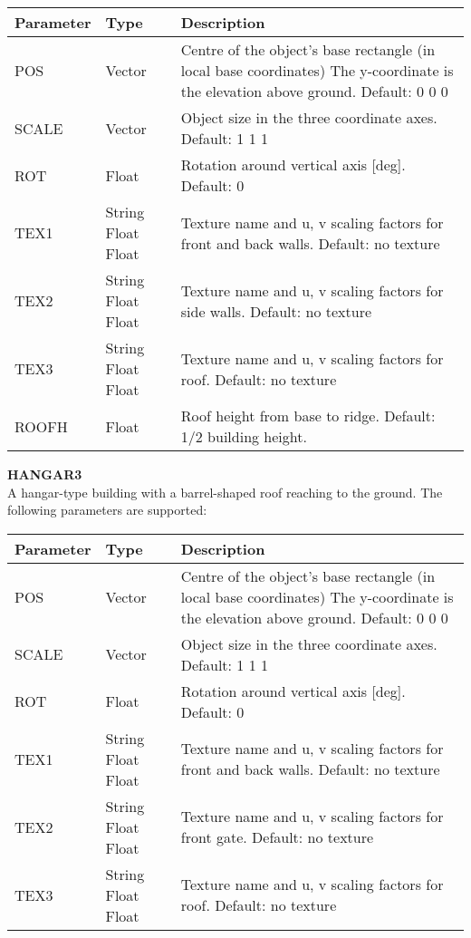 \documentclass[Orbiter Developer Manual.tex]{subfiles}
\begin{document}
	\begin{longtable}{ |p{}|p{}|p{}| }
	\hline\rule{0pt}{2ex}
	\textbf{Parameter} & \textbf{Type} & \textbf{Description}\\
	\hline\rule{0pt}{2ex}
	POS & Vector & Centre of the object’s base rectangle (in local base coordinates) The y-coordinate is the elevation above ground. Default: 0 0 0\\
	\hline\rule{0pt}{2ex}
	SCALE & Vector & Object size in the three coordinate axes. Default: 1 1 1\\
	\hline\rule{0pt}{2ex}
	ROT & Float & Rotation around vertical axis [deg]. Default: 0\\
	\hline\rule{0pt}{2ex}
	TEX1 & String Float Float & Texture name and u, v scaling factors for front and back walls. Default: no texture\\
	\hline\rule{0pt}{2ex}
	TEX2 & String Float Float & Texture name and u, v scaling factors for side walls. Default: no texture\\
	\hline\rule{0pt}{2ex}
	TEX3 & String Float Float & Texture name and u, v scaling factors for roof. Default: no texture\\
	\hline\rule{0pt}{2ex}
	ROOFH & Float & Roof height from base to ridge. Default: 1/2 building height.\\
	\hline
	\end{longtable}

\noindent
\textbf{HANGAR3}\\
A hangar-type building with a barrel-shaped roof reaching to the ground. The following parameters are supported:

	\begin{longtable}{ |p{}|p{}|p{}| }
	\hline\rule{0pt}{2ex}
	\textbf{Parameter} & \textbf{Type} & \textbf{Description}\\
	\hline\rule{0pt}{2ex}
	POS & Vector & Centre of the object’s base rectangle (in local base coordinates) The y-coordinate is the elevation above ground. Default: 0 0 0\\
	\hline\rule{0pt}{2ex}
	SCALE & Vector & Object size in the three coordinate axes. Default: 1 1 1\\
	\hline\rule{0pt}{2ex}
	ROT & Float & Rotation around vertical axis [deg]. Default: 0\\
	\hline\rule{0pt}{2ex}
	TEX1 & String Float Float & Texture name and u, v scaling factors for front and back walls. Default: no texture\\
	\hline\rule{0pt}{2ex}
	TEX2 & String Float Float & Texture name and u, v scaling factors for front gate. Default: no texture\\
	\hline\rule{0pt}{2ex}
	TEX3 & String Float Float & Texture name and u, v scaling factors for roof. Default: no texture\\
	\hline
	\end{longtable}
\end{document}
